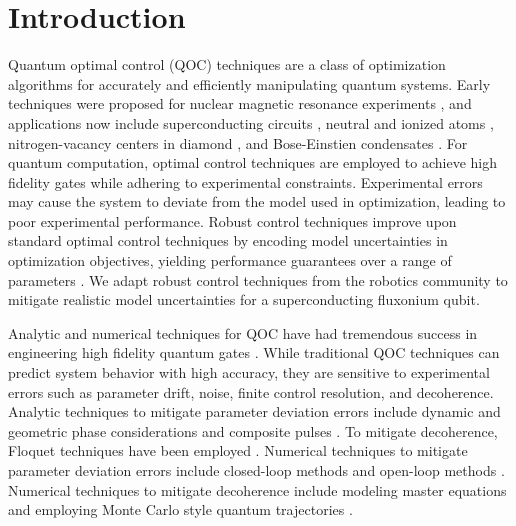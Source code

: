 \section{Introduction}
Quantum optimal control (QOC) techniques are a class of optimization
algorithms for accurately and efficiently manipulating quantum systems.
 Early techniques were proposed for nuclear magnetic resonance experiments
\cite{khaneja2005optimal}, and applications now include superconducting
circuits \cite{heeres2017implementing,
  huang2020engineering, leng2019robust, leung2017speedup, xu2020nonadiabatic},
neutral and ionized atoms \cite{
  brouzos2015quantum, de2008optimal, goerz2011quantum, guo2019high, jensen2019time,
  larrouy2020fast, omran2019generation, rosi2013fast, sorensen2019qengine,
  treutlein2006microwave, van2016optimal}, nitrogen-vacancy centers in
diamond \cite{chou2015optimal, dolde2014high, geng2016experimental,
  nobauer2015smooth, poggiali2018optimal, rembold2020introduction, tian2019optimal},
and Bose-Einstien condensates \cite{amri2019optimal, sorensen2018quantum}.
For quantum computation,
optimal control techniques are employed to achieve high fidelity gates
while adhering to experimental constraints.
Experimental errors may cause the system to deviate
from the model used in optimization, leading
to poor experimental performance.
Robust control techniques improve upon
standard optimal control techniques by encoding
model uncertainties
in optimization objectives, yielding performance
guarantees over a range of parameters \cite{Zhou97,Morimoto00,Manchester18}.
We adapt robust control techniques from the robotics community to mitigate
realistic model uncertainties for
a superconducting fluxonium qubit.

Analytic and numerical techniques for QOC have had tremendous success in
engineering high fidelity quantum gates \cite{
  chakram2020multimode, chou2015optimal, dolde2014high, egger2013optimized, egger2014adaptive,
  gokhale2019partial, grace2007optimal, heeres2017implementing, huang2014optimal,
  kelly2014optimal, leng2019robust, liebermann2016optimal,
  nebendahl2009optimal, rebentrost2009optimal, rebentrost2009optimal2,
  spiteri2018quantum, sporl2007optimal}. 
While traditional QOC techniques can predict system behavior
with high accuracy, they are sensitive to experimental
errors such as parameter drift, noise, finite control 
resolution, and decoherence. Analytic techniques to mitigate parameter deviation errors
include dynamic and geometric phase considerations
\cite{han2020experimental, xu2020nonadiabatic} and
composite pulses \cite{merrill2014progress}.
To mitigate decoherence, Floquet techniques have been employed
\cite{huang2020engineering, mundada2020floquet}.
Numerical techniques to mitigate parameter deviation errors
include closed-loop methods \cite{egger2014adaptive, feng2018gradient, huang2020engineering,
  wittler2020integrated} and open-loop methods \cite{
  allen2019robust, carvalho2020error, reinhold2019controlling,
  rembold2020introduction, kosut2013robust}.
Numerical techniques to mitigate decoherence include
modeling master equations \cite{rembold2020introduction} and employing
Monte Carlo style quantum trajectories \cite{abdelhafez2019gradient}.

